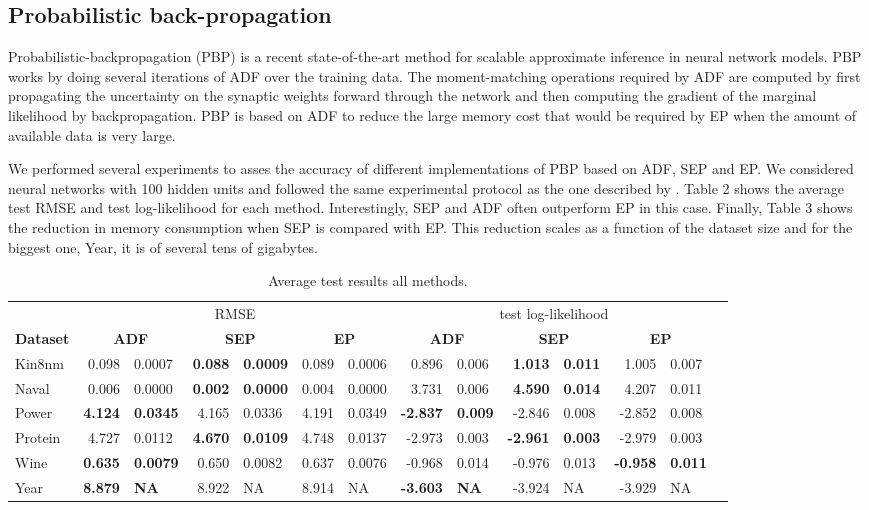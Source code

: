\subsection{Probabilistic back-propagation}

Probabilistic-backpropagation (PBP) \cite{hernandez2015probabilistic} is a
recent state-of-the-art method for scalable approximate inference in neural
network models. PBP works by doing several iterations of ADF over the training
data.  The moment-matching operations required by ADF are computed by
first propagating the uncertainty on the synaptic weights forward through the network
and then computing the gradient of the marginal likelihood by backpropagation.
PBP is based on ADF to reduce the large memory cost that would be required by EP
when the amount of available data is very large.

We performed several experiments to asses the accuracy of different implementations of PBP
based on ADF, SEP and EP. We considered neural networks with 100 hidden units and followed the same experimental protocol 
as the one described by \cite{hernandez2015probabilistic}.
Table 2 shows the average test RMSE and test log-likelihood for each method.
Interestingly, SEP and ADF often outperform EP in this case.
Finally, Table 3 shows the reduction in memory consumption when SEP is compared with EP.
This reduction scales as a function of the dataset size and for the biggest
one, Year, it is of several tens of gigabytes.
 
\begin{table} 
\small
\centering \label{tab:results} \begin{tabular}{l@{\ica}r@{$\pm$}l@{\ica}r@{$\pm$}l@{\ica}r@{$\pm$}l@{\ica}r@{$\pm$}l@{\ica}r@{$\pm$}l@{\ica}r@{$\pm$}l@{\ica}r@{$\pm$}}\hline 
{} & \multicolumn{6}{c}{RMSE} & \multicolumn{6}{c}{test log-likelihood} \\
\bf{Dataset}&\multicolumn{2}{c}{\bf{ ADF }}&\multicolumn{2}{c}{\bf{ SEP }}&\multicolumn{2}{c}{\bf{ EP }} &\multicolumn{2}{c}{\bf{ ADF }}&\multicolumn{2}{c}{\bf{ SEP }}&\multicolumn{2}{c}{\bf{ EP }} \\ \hline 
%
Kin8nm&0.098&0.0007&\bf{0.088}&\bf{0.0009}&0.089&0.0006
	&0.896&0.006&\bf{1.013}&\bf{0.011}&1.005&0.007\\ 
%
Naval&0.006&0.0000&\bf{0.002}&\bf{0.0000}&0.004&0.0000
	&3.731&0.006&\bf{4.590}&\bf{0.014}&4.207&0.011\\  
%
Power&\bf{4.124}&\bf{0.0345}&4.165&0.0336&4.191&0.0349
	&\bf{-2.837}&\bf{0.009}&-2.846&0.008&-2.852&0.008\\
% 
Protein&4.727&0.0112&\bf{4.670}&\bf{0.0109}&4.748&0.0137
	&-2.973&0.003&\bf{-2.961}&\bf{0.003}&-2.979&0.003\\ 
%
Wine&\bf{0.635}&\bf{0.0079}&0.650&0.0082&0.637&0.0076
	&-0.968&0.014&-0.976&0.013&\bf{-0.958}&\bf{0.011}\\  
%
Year&\bf{8.879}&\bf{   NA}&8.922&   NA&8.914&   NA
&\bf{-3.603}&\bf{  NA}&-3.924&  NA&-3.929&  NA\\
 \hline \end{tabular} 
\caption{ Average test results all methods. } 
 \end{table} 


